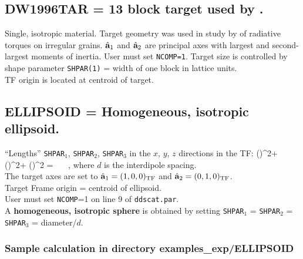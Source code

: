 \subsection{ DW1996TAR = 13 block target used by 
             \citet{Draine+Weingartner_1996}.
            \label{sec:DW1996TAR}}
	Single, isotropic material.
	Target geometry was used in study by \citet{Draine+Weingartner_1996} 
	of radiative torques on irregular grains.
	${\hat{\bf a}}_1$ and ${\hat{\bf a}}_2$ 
	are principal axes with largest and
	second-largest moments of inertia.
	User must set {\tt NCOMP=1}.
	Target size is controlled by shape parameter {\tt SHPAR(1)} = 
	width of one block in lattice units.\\
	TF origin is located at centroid of target.
\subsection{ ELLIPSOID = Homogeneous, isotropic ellipsoid.
            \label{sec:ELLIPSOID}}
	``Lengths'' 
	{\tt SHPAR$_1$}, {\tt SHPAR$_2$},
	{\tt SHPAR}$_3$ in the $x$, $y$, $z$ directions in the TF:
\beq
	\left(\right)^2+
        \left(\right)^2+
        \left(\right)^2 = 
        ~~~,
\eeq
	where $d$ is the interdipole spacing.\\
	The target axes are set to ${\hat{\bf a}}_1=(1,0,0)_{\rm TF}$ and 
	${\hat{\bf a}}_2=(0,1,0)_{\rm TF}$.\\
	Target Frame origin = centroid of ellipsoid.\\
	User must set {\tt NCOMP}=1 on line 9 of {\tt ddscat.par}.\\
	A {\bf homogeneous, isotropic sphere} is obtained by setting 
	{\tt SHPAR$_1$} = {\tt SHPAR$_2$} = {\tt SHPAR}$_3$ = diameter/$d$.

\subsubsection{\bf Sample calculation in directory examples\_exp/ELLIPSOID}

